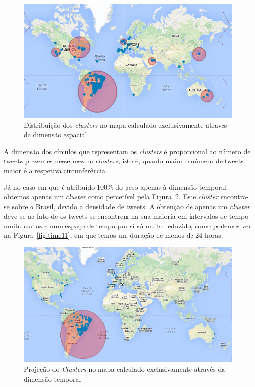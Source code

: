 \begin{figure}
\centering
\includegraphics[width=0.8\linewidth]{./figures/olhopassarinho/map31}
\caption{Distribuição dos \textit{clusters} no mapa calculado exclusivamente através da dimensão espacial}
\label{fig:map31}
\end{figure}

A dimensão dos círculos que representam os \textit{clusters} é proporcional ao número de tweets presentes nesse mesmo \textit{clusters}, isto é, quanto maior o número de tweets maior é a respetiva circunferência.

Já no caso em que é atribuído 100\% do peso apenas à dimensão temporal obtemos apenas um \textit{cluster} como percetível pela Figura~\ref{fig:map32}. Este \textit{cluster} encontra-se sobre o Brasil, devido a densidade de tweets. A obtenção de apenas um \textit{cluster} deve-se ao fato de os tweets se encontrem na sua maioria em intervalos de tempo muito curtos e num espaço de tempo por sí só muito reduzido, como podemos ver na Figura~\ref{fig:time11}, em que temos um duração de menos de 24 horas.

\begin{figure}[!h]
\centering
\includegraphics[width=0.8\linewidth]{./figures/olhopassarinho/map32}
\caption{Projeção do \textit{Clusters} no mapa calculado exclusivamente através da dimensão temporal}
\label{fig:map32}
\end{figure}

